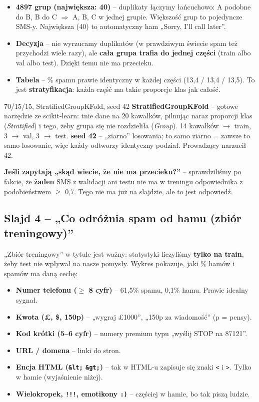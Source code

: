 \documentclass[11pt,a4paper]{article}
\begin{document}
\begin{itemize}
  \item \textbf{4897 grup (największa: 40)} -- duplikaty łączymy łańcuchowo: A podobne do B, B do C $\Rightarrow$ A, B, C w jednej
        grupie. Większość grup to pojedyncze SMS-y. Największa (40) to automatyczny ham „Sorry, I'll call later”.
  \item \textbf{Decyzja} -- nie wyrzucamy duplikatów (w prawdziwym świecie spam też przychodzi wiele razy), ale \textbf{cała grupa
        trafia do jednej części} (train albo val albo test). Dzięki temu nie ma przecieku.
  \item \textbf{Tabela} -- \% spamu prawie identyczny w każdej części (13,4 / 13,4 / 13,5). To jest \textbf{stratyfikacja}:
        każda część ma takie proporcje klas jak całość.
\end{itemize}

\begin{pojecie}{70/15/15, StratifiedGroupKFold, seed 42}
\textbf{StratifiedGroupKFold} -- gotowe narzędzie ze scikit-learn: tnie dane na 20 kawałków, pilnując naraz proporcji klas
(\emph{Stratified}) i tego, żeby grupa się nie rozdzieliła (\emph{Group}). 14 kawałków $\to$ train, 3 $\to$ val, 3 $\to$ test.
\textbf{seed 42} -- „ziarno” losowania; to samo ziarno = zawsze to samo losowanie, więc każdy odtworzy identyczny podział.
Prowadzący narzucił 42.
\end{pojecie}

\begin{uwaga}
\textbf{Jeśli zapytają „skąd wiecie, że nie ma przecieku?”} -- sprawdziliśmy po fakcie, że \textbf{żaden} SMS z walidacji
ani testu nie ma w treningu odpowiednika z podobieństwem $\geq$ 0,7. Tego nie ma już na slajdzie, ale to jest odpowiedź.
\end{uwaga}

\subsection{Slajd 4 -- „Co odróżnia spam od hamu (zbiór treningowy)”}

„Zbiór treningowy” w tytule jest ważny: statystyki liczyliśmy \textbf{tylko na train}, żeby test nie wpływał na nasze pomysły.
Wykres pokazuje, jaki \% hamów i spamów ma daną cechę:
\begin{itemize}
  \item \textbf{Numer telefonu ($\geq$ 8 cyfr)} -- 61,5\% spamu, 0,1\% hamu. Prawie idealny sygnał.
  \item \textbf{Kwota (£, \$, 150p)} -- „wygraj £1000”, „150p za wiadomość” (p = pensy).
  \item \textbf{Kod krótki (5--6 cyfr)} -- numery premium typu „wyślij STOP na 87121”.
  \item \textbf{URL / domena} -- linki do stron.
  \item \textbf{Encja HTML (\texttt{\&lt;} \texttt{\&gt;})} -- tak w HTML-u zapisuje się znaki \texttt{<} i \texttt{>}. Tylko w hamie (wyjaśnienie niżej).
  \item \textbf{Wielokropek, \texttt{!!!}, emotikony \texttt{:)}} -- częściej w hamie, bo tak piszą ludzie.
\end{itemize}
\end{document}
